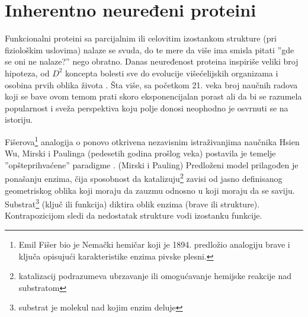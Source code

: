 
\chapter{Inherentno neuređeni proteini} %

\label{IDP} %


Funkcionalni proteini sa parcijalnim ili celovitim izostankom strukture (pri
fiziološkim uslovima) nalaze se svuda, do te mere da više ima smisla pitati
''gde se oni ne nalaze?'' nego obratno\parencite{uversky2016}.
Danas neuređenost proteina inspiriše veliki broj hipoteza, od $D^2$ koncepta
bolesti\parencite{d2uversky2008} sve do evolucije višećelijskih
organizama\parencite{romero2006} i osobina prvih oblika života
\parencite{trifonov2000, uversky2016}. Šta više, sa početkom 21. veka broj
naučnih radova koji se bave ovom temom prati skoro eksponencijalan
porast\parencite{oldfield2014} ali  da bi se razumela popularnost i sveža
perspektiva koju polje donosi neophodno je osvrnuti se na istoriju.

Fišerova\footnote{ Emil Fišer bio je Nemački hemičar koji je 1894. predložio analogiju brave i ključa opisujući
  karakteristike enzima pivske plesni\parencite{dunker2001}.
} analogija o  ponovo otkrivena nezavisnim
istraživanjima naučnika Hsien Wu,  Mirski i Paulinga (pedesetih godina prošlog
veka) postavila je temelje ''opšteprihvaćene'' 
paradigme \parencite{dunker2001}.
 (Mirski i Pauling)
Predloženi model prilagođen je ponašanju enzima, čija sposobnost da
katalizuju\footnote{katalizacij podrazumeva ubrzavanje ili omogućavanje
hemijske reakcije nad substratom\parencite{biology}}  zavisi od jasno definisanog geometriskog
oblika koji moraju da zauzmu odnosno u koji moraju da se saviju.
Substrat\footnote{substrat je molekul nad kojim enzim deluje\parencite{biology}} (ključ ili
funkcija) diktira oblik enzima (brave ili strukture)\parencite{biology}.
Kontrapozicijom sledi da nedostatak strukture vodi izostanku funkcije.

